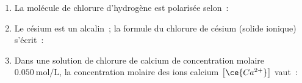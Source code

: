 \begin{enumerate}
    \item La molécule de chlorure d'hydrogène est polarisée selon~: \par
    \item Le césium est un alcalin~; la formule du chlorure de césium (solide
          ionique) s'écrit~: \par
    \item Dans une solution de chlorure de calcium  de concentration
          molaire $\qty{0.050}{\mol\per\L}$, la concentration
          molaire des ions calcium $\left[\ce{Ca^{2+}}\right]$ vaut~: \par
\end{enumerate}


